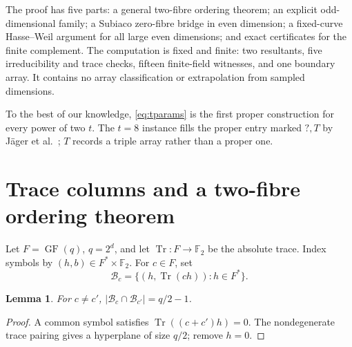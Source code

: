 \documentclass[11pt]{article}
\newtheorem{lemma}[theorem]{Lemma}
\theoremstyle{definition}\newtheorem{definition}[theorem]{Definition}
\theoremstyle{remark}\newtheorem{remark}[theorem]{Remark}
\DeclareMathOperator{\Tr}{Tr}
\DeclareMathOperator{\GF}{GF}
\newcommand{\F}{\mathbb F}
\begin{document}
The proof has five parts: a general two-fibre ordering theorem; an explicit
odd-dimensional family; a Subiaco zero-fibre bridge in even dimension; a
fixed-curve Hasse--Weil argument for all large even dimensions; and exact
certificates for the finite complement.  The computation is fixed and finite:
two resultants, five irreducibility and trace checks, fifteen finite-field
witnesses, and one boundary array.  It contains no array classification or
extrapolation from sampled dimensions.

To the best of our knowledge, \eqref{eq:tparams} is the first proper
construction for every power of two \(t\).  The \(t=8\) instance fills the
proper entry marked \(?,T\) by Jäger et al.~\cite[Table~2]{jager}; \(T\)
records a triple array rather than a proper one.

\section{Trace columns and a two-fibre ordering theorem}
Let \(F=\GF(q)\), \(q=2^d\), and let \(\Tr:F\to\F_2\) be the absolute
trace.  Index symbols by \((h,b)\in F^*\times\F_2\).  For \(c\in F\), set
\begin{equation}
 \mathcal B_c=\{(h,\Tr(ch)):h\in F^*\}.
 \label{eq:columns}
\end{equation}

\begin{lemma}
For \(c\neq c'\), \(|\mathcal B_c\cap\mathcal B_{c'}|=q/2-1\).
\end{lemma}
\begin{proof}
A common symbol satisfies \(\Tr((c+c')h)=0\).  The nondegenerate trace
pairing gives a hyperplane of size \(q/2\); remove \(h=0\).
\end{proof}
\end{document}
